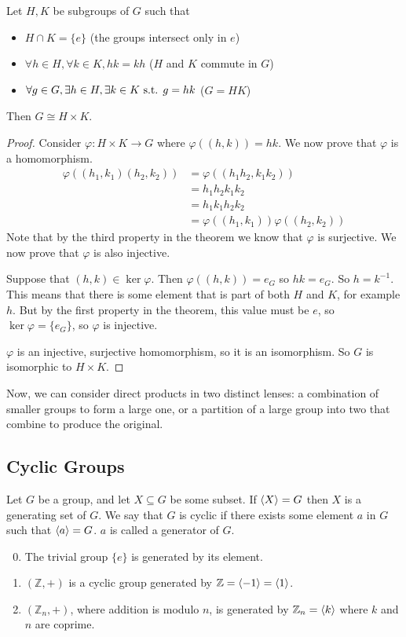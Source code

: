 \documentclass{article}
\begin{document}
	\begin{theorem}
		Let $H, K$ be subgroups of $G$ such that
		\begin{itemize}
			\item $H \cap K = \{ e \}$ (the groups intersect only in $e$)
			\item $\forall h \in H, \forall k \in K, hk = kh$ ($H$ and $K$ commute in $G$)
			\item $\forall g \in G, \exists h \in H, \exists k \in K \text{ s.t. } g = hk$ ($G = HK$)
		\end{itemize}
		Then $G \cong H \times K$.
	\end{theorem}
	\begin{proof}
		Consider $\varphi: H \times K \to G$ where $\varphi((h, k)) = hk$. We now prove that $\varphi$ is a homomorphism.
		\begin{align*}
			\varphi((h_1, k_1)(h_2, k_2)) &= \varphi((h_1h_2, k_1k_2)) \\
			&= h_1h_2k_1k_2 \\
			&= h_1k_1h_2k_2 \\
			&= \varphi((h_1, k_1))\varphi((h_2, k_2))
		\end{align*}
		Note that by the third property in the theorem we know that $\varphi$ is surjective. We now prove that $\varphi$ is also injective.
		
		Suppose that $(h, k) \in \ker \varphi$. Then $\varphi((h, k)) = e_G$ so $hk = e_G$. So $h = k^{-1}$. This means that there is some element that is part of both $H$ and $K$, for example $h$. But by the first property in the theorem, this value must be $e$, so $\ker \varphi = \{ e_G \}$, so $\varphi$ is injective.
		
		$\varphi$ is an injective, surjective homomorphism, so it is an isomorphism. So $G$ is isomorphic to $H \times K$.
	\end{proof}

	\noindent Now, we can consider direct products in two distinct lenses: a combination of smaller groups to form a large one, or a partition of a large group into two that combine to produce the original.

	\subsection{Cyclic Groups}
	\begin{definition}
		Let $G$ be a group, and let $X \subseteq G$ be some subset. If $\langle X \rangle = G$ then $X$ is a generating set of $G$. We say that $G$ is cyclic if there exists some element $a$ in $G$ such that $\langle a \rangle = G$. $a$ is called a generator of $G$.
	\end{definition}
	\begin{enumerate}
		\setcounter{enumi}{-1}
		\item The trivial group $\{ e \}$ is generated by its element.
		\item $(\mathbb Z, +)$ is a cyclic group generated by $\mathbb Z = \langle -1 \rangle = \langle 1 \rangle$.
		\item $(\mathbb Z_n, +)$, where addition is modulo $n$, is generated by $\mathbb Z_n = \langle k \rangle$ where $k$ and $n$ are coprime.
	\end{enumerate}
\end{document}
